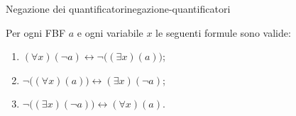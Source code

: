 \begin{concetto}
\begin{Teorema}{Negazione dei quantificatori}{negazione-quantificatori}
    \begin{prerequisiti}
    \end{prerequisiti}
    Per ogni FBF $a$ e ogni variabile $x$ le seguenti formule sono valide:
    \begin{enumerate}
        \item $(\forall x)(\neg a) \leftrightarrow \neg\big((\exists x)(a)\big)$;
        \item $\neg\big((\forall x)(a)\big) \leftrightarrow (\exists x)(\neg a)$;
        \item $\neg\big((\exists x)(\neg a)\big) \leftrightarrow (\forall x)(a)$.
    \end{enumerate}
\end{Teorema}


\end{concetto}

